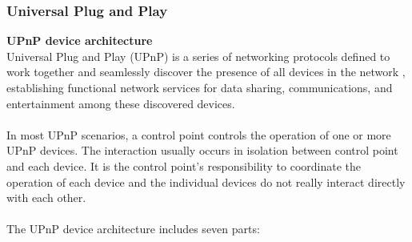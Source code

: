 \subsubsection[UPnP]{Universal Plug and Play}
\textbf{UPnP device architecture}\\ 
Universal Plug and Play (UPnP) is a series of networking protocols defined to 
work together and seamlessly discover the presence of all devices in the network 
, establishing functional network services for data sharing, communications, and 
entertainment among these discovered devices.\\
\\ 
In most UPnP scenarios, a control point controls the operation of one or more 
UPnP devices. The interaction usually occurs in isolation between control point 
and each device. It is the control point's responsibility to coordinate the operation of 
each device and the individual devices do not really interact directly with each other. \\
\\
The UPnP device architecture \cite{upnp} \label{upnp} \label{upnpdevice} 
includes seven parts:
